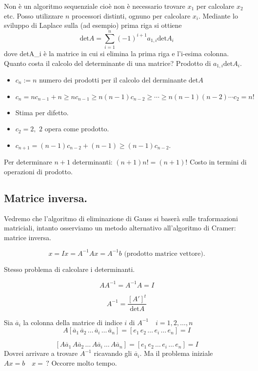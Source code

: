 Non è un algoritmo sequenziale cioè non è necessario trovare $x_1$ per
calcolare $x_2$ etc.
Posso utilizzare $n$ processori distinti, ognuno per calcolare $x_i$.
Mediante lo sviluppo di Laplace sulla (ad esempio) prima riga si ottiene
\[\textrm{det}A = \sum_{i = 1}^{n}(-1)^{i+1}a_{1,i}\textrm{det}A_i\]
dove \textrm{det}A_i è la matrice in cui si elimina la prima riga e l'i-esima
colonna.
Quanto costa il calcolo del determinante di una matrice?
\newline
Prodotto di $a_{1,i}\textrm{det}A_i$.
\begin{itemize}
\item[]$c_n := n$ numero dei prodotti per il calcolo del derminante det$A$
\item[]$c_n = n c_{n -1} + n\geq n c_{n-1} \geq
n(n-1) c_{n-2} \geq \cdots \geq n(n-1)(n-2) \cdots c_2 = n!$
\item[]Stima per difetto.
\item[]$c_2 = 2,$ $ 2$ opera come prodotto.
\item[]$c_{n+1} = (n-1)c_{n-2} + (n-1) \geq (n-1)c_{n-2}$.
\end{itemize}

Per determinare $n+1$ determinanti: $(n+1)n! = (n+1)!$
Costo in termini di operazioni di prodotto.

\subsection*{Matrice inversa.}
Vedremo che l'algoritmo di eliminazione di Gauss si baserà sulle traformazioni
matriciali, intanto osserviamo un metodo alternativo all'algoritmo di Cramer:
matrice inversa.

\[x = Ix = A^{-1}Ax = A^{-1}b \textrm{ (prodotto matrice vettore).}\]

Stesso problema di calcolare i determinanti.

\[A A^{-1} = A^{-1} A = I\]

\[A^{-1} = \frac{[A']^t}{\textrm{det}A}\]

Sia $\overline{a}_i$ la colonna della matrice di indice $i$ di
$A^{-1} \quad i = 1, 2, \ldots , n$
\[
A[\overline{a}_1\, \overline{a}_2\, \ldots\, \overline{a}_i\, \ldots\,
\overline{a}_n] = [e_1\, e_2\, \ldots\, e_i\, \ldots\, e_n] = I\]

\[[A\overline{a}_1\, A\overline{a}_2\, \ldots\, A\overline{a}_i\, \ldots\,
A\overline{a}_n] = [e_1\, e_2\, \ldots\, e_i\, \ldots\, e_n] = I\]
Dovrei arrivare a trovare $A^{-1}$ ricavando gli $\overline{a}_i$.
\newline Ma il problema iniziale $Ax = b\quad  x = \, ?$
Occorre molto tempo.

